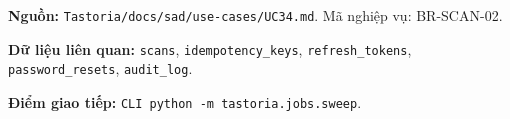 \textbf{Nguồn:} {\small\texttt{Tastoria/\allowbreak{}\allowbreak{}docs/\allowbreak{}\allowbreak{}sad/\allowbreak{}\allowbreak{}use-\allowbreak{}cases/\allowbreak{}\allowbreak{}UC34.\allowbreak{}md}}. Mã nghiệp vụ: BR-\allowbreak{}SCAN-\allowbreak{}02.

\textbf{Dữ liệu liên quan:} {\small\texttt{scans}}, {\small\texttt{idempotency\_\allowbreak{}\allowbreak{}keys}}, {\small\texttt{refresh\_\allowbreak{}\allowbreak{}tokens}}, {\small\texttt{password\_\allowbreak{}\allowbreak{}resets}}, {\small\texttt{audit\_\allowbreak{}\allowbreak{}log}}.

\textbf{Điểm giao tiếp:} {\small\texttt{CLI python -\allowbreak{}m tastoria.\allowbreak{}jobs.\allowbreak{}sweep}}.
